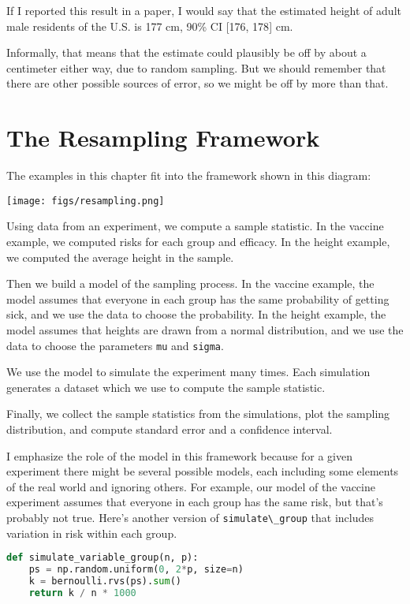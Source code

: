 If I reported this result in a paper, I would say that the estimated
height of adult male residents of the U.S. is 177 cm, 90\% CI {[}176,
178{]} cm.

Informally, that means that the estimate could plausibly be off by about
a centimeter either way, due to random sampling. But we should remember
that there are other possible sources of error, so we might be off by
more than that.

\section{The Resampling Framework}\label{the-resampling-framework}

The examples in this chapter fit into the framework shown in this
diagram:

\texttt{[image: figs/resampling.png]}

Using data from an experiment, we compute a sample statistic. In the
vaccine example, we computed risks for each group and efficacy. In the
height example, we computed the average height in the sample.

Then we build a model of the sampling process. In the vaccine example,
the model assumes that everyone in each group has the same probability
of getting sick, and we use the data to choose the probability. In the
height example, the model assumes that heights are drawn from a normal
distribution, and we use the data to choose the parameters
\passthrough{\lstinline!mu!} and \passthrough{\lstinline!sigma!}.

We use the model to simulate the experiment many times. Each simulation
generates a dataset which we use to compute the sample statistic.

Finally, we collect the sample statistics from the simulations, plot the
sampling distribution, and compute standard error and a confidence
interval.

I emphasize the role of the model in this framework because for a given
experiment there might be several possible models, each including some
elements of the real world and ignoring others. For example, our model
of the vaccine experiment assumes that everyone in each group has the
same risk, but that's probably not true. Here's another version of
\passthrough{\lstinline!simulate\_group!} that includes variation in
risk within each group.

\begin{lstlisting}[language=Python,style=source]
def simulate_variable_group(n, p):
    ps = np.random.uniform(0, 2*p, size=n)
    k = bernoulli.rvs(ps).sum()
    return k / n * 1000
\end{lstlisting}

